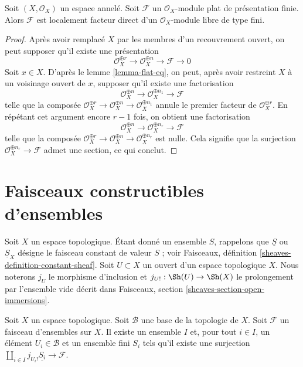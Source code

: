 \begin{lemma}
\label{lemma-flat-locally-finite-presentation}
Soit $(X, \mathcal{O}_X)$ un espace annelé. Soit $\mathcal{F}$ un
$\mathcal{O}_X$-module plat de présentation finie. Alors $\mathcal{F}$ est
localement facteur direct d'un $\mathcal{O}_X$-module libre de type fini.
\end{lemma}

\begin{proof}
Après avoir remplacé $X$ par les membres d'un recouvrement ouvert, on peut
supposer qu'il existe une présentation
$$
\mathcal{O}_X^{\oplus r} \to
\mathcal{O}_X^{\oplus n} \to \mathcal{F} \to 0
$$
Soit $x \in X$. D'après le lemme \ref{lemma-flat-eq},
on peut, après avoir restreint $X$ à un voisinage
ouvert de $x$, supposer qu'il existe une factorisation
$$
\mathcal{O}_X^{\oplus n} \to
\mathcal{O}_X^{\oplus n_1} \to \mathcal{F}
$$
telle que la composée
$\mathcal{O}_X^{\oplus r} \to \mathcal{O}_X^{\oplus n} \to
\mathcal{O}_X^{\oplus n_1}$
annule le premier facteur de $\mathcal{O}_X^{\oplus r}$.
En répétant cet argument encore $r - 1$ fois, on obtient une factorisation
$$
\mathcal{O}_X^{\oplus n} \to
\mathcal{O}_X^{\oplus n_r} \to \mathcal{F}
$$
telle que la composée
$\mathcal{O}_X^{\oplus r} \to \mathcal{O}_X^{\oplus n}
\to \mathcal{O}_X^{\oplus n_r}$ est nulle.
Cela signifie que la surjection $\mathcal{O}_X^{\oplus n_r} \to \mathcal{F}$
admet une section, ce qui conclut.
\end{proof}







\section{Faisceaux constructibles d'ensembles}
\label{section-constructible}

\noindent
Soit $X$ un espace topologique. Étant donné un ensemble $S$, rappelons que $\underline{S}$
ou $\underline{S}_X$ désigne le faisceau constant de valeur $S$ ; voir
Faisceaux, définition \ref{sheaves-definition-constant-sheaf}.
Soit $U \subset X$ un ouvert d'un espace topologique $X$.
Nous noterons $j_U$ le morphisme d'inclusion et
$j_{U!} : \Sh(U) \to \Sh(X)$ le prolongement par l'ensemble vide
décrit dans Faisceaux, section \ref{sheaves-section-open-immersions}.

\begin{lemma}
\label{lemma-surjection}
Soit $X$ un espace topologique. Soit $\mathcal{B}$ une base de la
topologie de $X$. Soit $\mathcal{F}$ un faisceau d'ensembles sur $X$.
Il existe un ensemble $I$ et, pour tout $i \in I$, un élément
$U_i \in \mathcal{B}$ et un ensemble fini $S_i$ tels qu'il existe
une surjection $\coprod_{i \in I} j_{U_i!}\underline{S_i} \to \mathcal{F}$.
\end{lemma}

